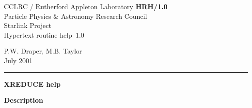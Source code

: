 \documentclass[11pt]{article}
\newcommand{\stardoccategory}  {Hypertext routine help}
\newcommand{\stardocinitials}  {HRH}
\newcommand{\stardocnumber}    {1.0}
\newcommand{\stardocauthors}   {P.W. Draper, M.B. Taylor}
\newcommand{\stardocdate}      {July 2001}
\newcommand{\stardoctitle}     {XREDUCE help}
\newcommand{\stardocname}{\stardocinitials /\stardocnumber}
\newenvironment{latexonly}{}{}
\begin{document}
\thispagestyle{empty}

\begin{latexonly}
   CCLRC / {\sc Rutherford Appleton Laboratory} \hfill {\bf \stardocname}\\
   {\large Particle Physics \& Astronomy Research Council}\\
   {\large Starlink Project\\}
   {\large \stardoccategory\ \stardocnumber}
   \begin{flushright}
   \stardocauthors\\
   \stardocdate
   \end{flushright}
   \vspace{-4mm}
   \rule{\textwidth}{0.5mm}
   \vspace{5mm}
   \begin{center}
   {\Large\bf \stardoctitle}
   \end{center}
   \vspace{5mm}

   \vspace{10mm}
   \begin{center}
      {\Large\bf Description}
   \end{center}
\end{latexonly}
\end{document}
